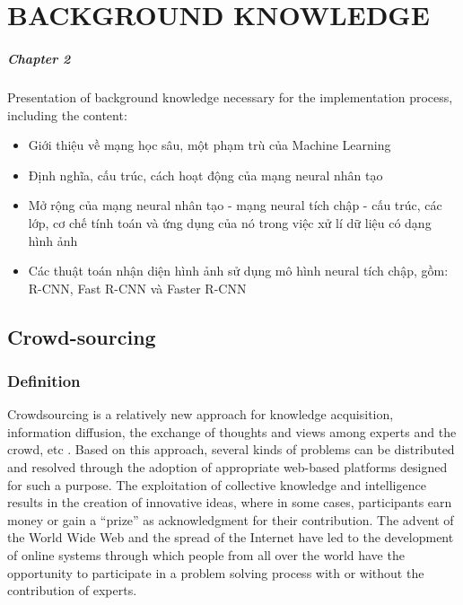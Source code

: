 \chapter{BACKGROUND KNOWLEDGE}
\label{chap:background}

\paragraph{Chapter 2} Presentation of background knowledge necessary for the implementation process, including the content:


\begin{itemize}
\item Giới thiệu về mạng học sâu, một phạm trù của Machine Learning

\item Định nghĩa, cấu trúc, cách hoạt động của mạng neural nhân tạo

\item Mở rộng của mạng neural nhân tạo - mạng neural tích chập - cấu trúc, các lớp, cơ chế tính toán và ứng dụng của nó trong việc xử lí dữ liệu có dạng hình ảnh

\item Các thuật toán nhận diện hình ảnh sử dụng mô hình neural tích chập, gồm: R-CNN, Fast R-CNN và Faster R-CNN
\end{itemize}

\section{Crowd-sourcing}
\subsection{Definition}
Crowdsourcing is a relatively new approach for knowledge acquisition, information diffusion, the exchange of thoughts and views among experts and the crowd, etc \cite{futureinternet0600109}. Based on this approach, several kinds of problems can be distributed and resolved through the adoption of appropriate web-based platforms designed for such a purpose. The exploitation of collective knowledge and intelligence results in the creation of innovative ideas, where in some cases, participants earn money or gain a “prize” as acknowledgment for their contribution. The advent of the World Wide Web and the spread of the Internet have led to the development of online systems through which people from all over the world have the opportunity to participate in a problem solving process with or without the contribution of experts. 

